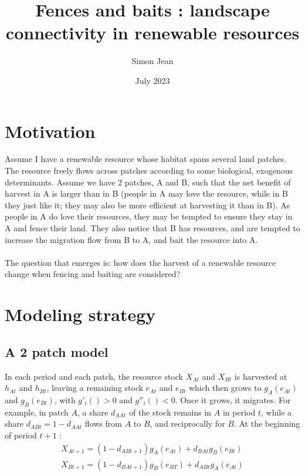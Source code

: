 \documentclass{article}
\title{Fences and baits : landscape connectivity in renewable resources}
\author{Simon Jean}
\date{July 2023}
\begin{document}
\maketitle

\section{Motivation}
Assume I have a renewable resource whose habitat spans several land patches. The resource freely flows across patches according to some biological, exogenous determinants.  Assume we have 2 patches, A and B, such that the net benefit of harvest in A is larger than in B (people in A may love the resource, while in B they just like it; they may also be more efficient at harvesting it than in B). As people in A do love their resources, they may be tempted to ensure they stay in A and fence their land. They also notice that B has resources, and are tempted to increase the migration flow from B to A, and bait the resource into A. \\\\
The question that emerges is: how does the harvest of a renewable resource change when fencing and baiting are considered?

\section{Modeling strategy}
\subsection{A 2 patch model}
In each period and each patch, the resource stock $X_{At}$ and $ X_{Bt}$ is harvested at $h_{At}$ and $h_{Bt}$, leaving a remaining stock $e_{At}$ and $ e_{Bt}$ which then grows to $g_A(e_{At})$ and $g_B(e_{Bt})$, with $g'_i()>0$ and $g''_i()<0$. Once it grows, it migrates. For example, in patch $A$, a share $d_{AAt}$ of the stock remains in $A$ in period $t$, while a share $d_{ABt} = 1-d_{AAt}$ flows from $A$ to $B$, and reciprocally for $B$. At the beginning of period $t+1$ : 
\begin{align}
    X_{At+1} = (1-d_{ABt+1})g_A(e_{At})+d_{BAt}g_B(e_{Bt})
    \\
    X_{Bt+1} = (1 - d_{BAt+1})g_B(e_{BT}) + d_{ABt}g_A(e_{At})
\end{align}
\end{document}
